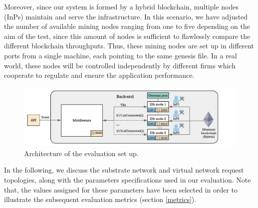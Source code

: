 Moreover, since our system is formed by a hybrid blockchain, multiple nodes (InPs) maintain and serve the infrastructure. In this scenario, we have adjusted the number of available mining nodes ranging from one to five depending on the aim of the test, since this amount of nodes is sufficient to flawlessly compare the different blockchain throughputs. Thus, these mining nodes are set up in different ports from a single machine, each pointing to the same genesis file. In a real world, these nodes will be controlled independently by different firms which cooperate to regulate and ensure the application performance.

\begin{figure}[bth]
	\centering
	\includegraphics[width=1\linewidth]{gfx/Evaluation_scenario}    
  	\caption{Architecture of the evaluation set up.}
  	\label{fig:ev_scenario}
\end{figure}

In the following, we discuss the substrate network and virtual network request topologies, along with the parameters specifications used in our evaluation. Note that, the values assigned for these parameters have been selected in order to illustrate the subsequent evaluation metrics (section \ref{metrics}).

